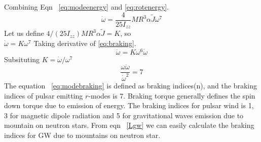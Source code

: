 \documentclass{ttuthes2007}
\begin{document}
Combining Eqn ~\ref{eq:modeenergy} and \ref{eq:rotenergy}.
\begin{equation}\label{eq:braking}
\dot{\omega}=\frac{4}{25 I_{zz}}M R^3 \alpha\tilde{J} \omega^7 
\end{equation}
Let us define $4/(25 I_{zz})M R^3 \alpha\tilde{J}=K$, so\\
$\dot{\omega}=K \omega^7$
Taking derivative of \ref{eq:braking}.
\begin{equation}
\ddot{\omega}= K\omega^6\dot{\omega}
\end{equation}
Subsituting $K=\dot{\omega}/\omega^7$
\begin{equation}\label{eq:modebraking}
\frac{\omega\ddot{\omega}}{\dot{\omega}^2}=7
\end{equation}
The equation ~\ref{eq:modebraking} is defined as braking indices(n), and the
braking indices of pulsar emitting $r$-modes is 7. Braking torque generally
defines the spin down torque due to emission of energy. The braking indices for
pulsar wind is 1, 3 for magnetic dipole radiation and 5 for gravitational waves 
emission due to mountain on neutron stars. From eqn ~\ref{Lgw} we can easily
calculate the braking indices for \ac{GW} due to mountains on neutron star.
\end{document}
